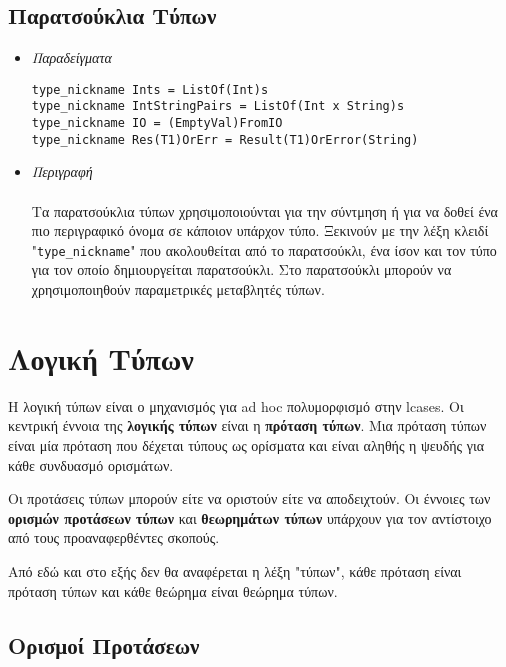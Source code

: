 \documentclass[diploma]{softlab-thesis}
\begin{document}
\subsection{Παρατσούκλια Τύπων}

\begin{itemize}

\item \textit{Παραδείγματα}

\begin{verbatim}
type_nickname Ints = ListOf(Int)s
type_nickname IntStringPairs = ListOf(Int x String)s
type_nickname IO = (EmptyVal)FromIO
type_nickname Res(T1)OrErr = Result(T1)OrError(String)
\end{verbatim}

\item \textit{Περιγραφή} \\\\
Τα παρατσούκλια τύπων χρησιμοποιούνται για την σύντμηση ή για να δοθεί
ένα πιο περιγραφικό όνομα σε κάποιον υπάρχον τύπο. Ξεκινούν με την λέξη
κλειδί "\verb|type_nickname|" που ακολουθείται από το παρατσούκλι, ένα ίσον
και τον τύπο για τον οποίο δημιουργείται παρατσούκλι. Στο παρατσούκλι μπορούν
να χρησιμοποιηθούν παραμετρικές μεταβλητές τύπων.

\end{itemize}

\newpage

\section{Λογική Τύπων}
\label{subsec:typelogicgr}

Η λογική τύπων είναι ο μηχανισμός για ad hoc πολυμορφισμό στην lcases.
Οι κεντρική έννοια της \textbf{λογικής τύπων} είναι η \textbf{πρόταση τύπων}.
Μια πρόταση τύπων είναι μία πρόταση που δέχεται τύπους ως ορίσματα και
είναι αληθής η ψευδής για κάθε συνδυασμό ορισμάτων.

Οι προτάσεις τύπων μπορούν είτε να οριστούν είτε να αποδειχτούν.
Οι έννοιες των \textbf{ορισμών προτάσεων τύπων} και \textbf{θεωρημάτων τύπων}
υπάρχουν για τον αντίστοιχο από τους προαναφερθέντες σκοπούς.

Από εδώ και στο εξής δεν θα αναφέρεται η λέξη "τύπων", κάθε πρόταση είναι πρόταση
τύπων και κάθε θεώρημα είναι θεώρημα τύπων.

\subsection{Ορισμοί Προτάσεων}
\end{document}
